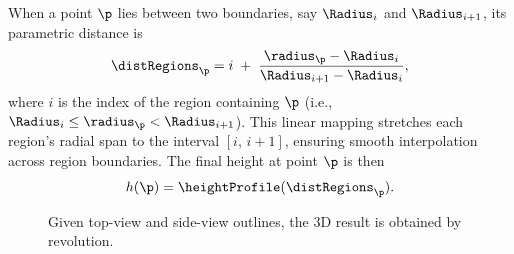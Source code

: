When a point $\p$ lies between two boundaries, say $\Radius_{i}$ and $\Radius_{i+1}$, its parametric distance is
\begin{align}
    \distRegions_\p = i \;+\; \frac{\radius_\p - \Radius_{i}}{\Radius_{i + 1} - \Radius_{i}},
\end{align}
where $i$ is the index of the region containing $\p$ (i.e., $\Radius_i \le \radius_\p < \Radius_{i+1}$). This linear mapping stretches each region's radial span to the interval $[i,\,i+1]$, ensuring smooth interpolation across region boundaries. The final height at point $\p$ is then
\begin{align}
    h(\p) = \heightProfile(\distRegions_\p).
\end{align}

\begin{figure}
    \caption{Given top-view and side-view outlines, the 3D result is obtained by revolution. }
    \label{fig:coral-island_procedural-smooth-heights}
\end{figure}



\begin{deferredfigure}
    \caption{Providing a smooth function between each region results in islands with plausible reliefs. We fixed the outlines while editing only the height function in order to produce, from top to bottom, a low island, a coral reef island, and finally an identical island without the reef. }
    \label{fig:coral-island_procedural-smooth-heights-multiple-examples}
\end{deferredfigure}





